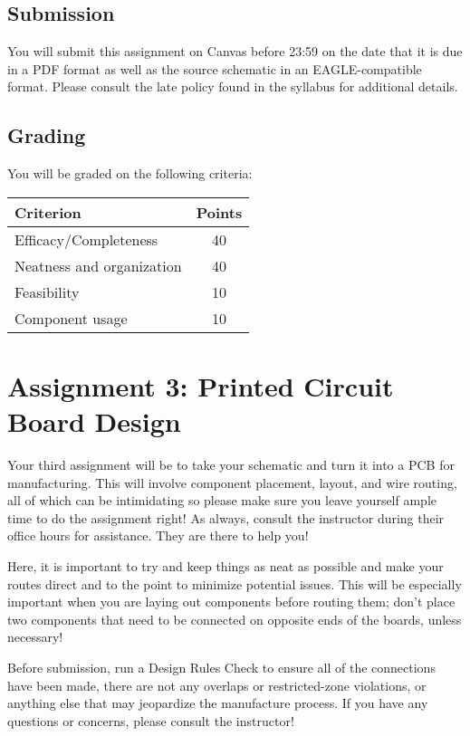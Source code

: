     \subsection*{Submission}
    You will submit this assignment on Canvas before 23:59 on the date that it is due in a PDF format as well as the source schematic in an EAGLE-compatible format.
    Please consult the late policy found in the syllabus for additional details.

    \subsection*{Grading}
    You will be graded on the following criteria:

    \begin{table}[h!]
        \begin{tabular}{l | c}
            \toprule
            Criterion & Points \\

            \midrule
            Efficacy/Completeness & 40 \\
            Neatness and organization & 40 \\
            Feasibility & 10 \\
            Component usage & 10 \\
            \bottomrule
        \end{tabular}
    \end{table}

\section*{Assignment 3: Printed Circuit Board Design}
Your third assignment will be to take your schematic and turn it into a PCB for manufacturing.
This will involve component placement, layout, and wire routing, all of which can be intimidating so please make sure you leave yourself ample time to do the assignment right!
As always, consult the instructor during their office hours for assistance.
They are there to help you!

Here, it is important to try and keep things as neat as possible and make your routes direct and to the point to minimize potential issues.
This will be especially important when you are laying out components before routing them; don't place two components that need to be connected on opposite ends of the boards, unless necessary!

Before submission, run a Design Rules Check to ensure all of the connections have been made, there are not any overlaps or restricted-zone violations, or anything else that may jeopardize the manufacture process.
If you have any questions or concerns, please consult the instructor!

